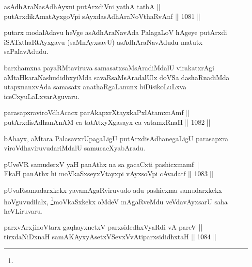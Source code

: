 \begin{shl}
asAdhAraNasAdhAyxni putArxdiVni yathA tathA || \\
putArxdikAmatAyxgoV\s pi sAyxdasAdhAraNoV\s thaRvAnf \hfill || 1081 ||  
\end{shl}

\begin{artha}
putarx modalAdavu heVge asAdhAraNavAda PalagaLoV hAgeye putArxdi iSATxthaRtAyxgavu (saMnAyxsavU) asAdhAraNavAdudu matutx saPalavAdudu.
\end{artha}

\begin{artha}
barxhamxna payaRMtaviruva samasatxsaMsAradiMdalU virakatxrAgi aMtaHkaraNashudidhxyiMda savaRsaMsAradalUlx doVSa dashaRnadiMda utapxnanxvAda samasatx anathaRgaLanunx biDisikoLuLxva iceCxyuLaLxvarAguvaru.
\end{artha}


\begin{shl}
parasapxraviroVdhAcacx parAkapxrXtayxkaPxlAtamxnAmf || \\
putArxdisAdhanAnAM ca tatAtxyXgasayx ca vatamxRnaH \hfill || 1082 ||  
\end{shl}

\begin{artha}
bAhayx, aMtara PalasavxrUpagaLigU putArxdisAdhanegaLigU parasapxra viroVdhaviruvudariMdalU samucacXyabAradu.
\end{artha}


\begin{shl}
pUveVR samuderxV yaH panAthx na sa gacaCxti pashicxmamf ||  \\
EkaH panAthx hi moVkaSxseyxVtayxpi vAyxsoV\s pi cAvadatf \hfill || 1083 ||  
\end{shl}

\begin{artha}
pUvaRsamudarxkekx yavamAgaRviruvudo adu pashicxma samudarxkekx hoVguvudilalx, \footnote{}moVkaSxkekx oMdeV mAgaRveMdu veVdavAyxsarU saha heVLiruvaru.
\end{artha}



\begin{shl}
parxvArxjinoV\s tarx gaqhayxnetxV parxsidedhxVyaRdi vA pareV || \\
tirxdaNiDxnaH samAKAyxyAsetxVSevxVvAtiparxsididhxtaH \hfill || 1084 ||  
\end{shl}


